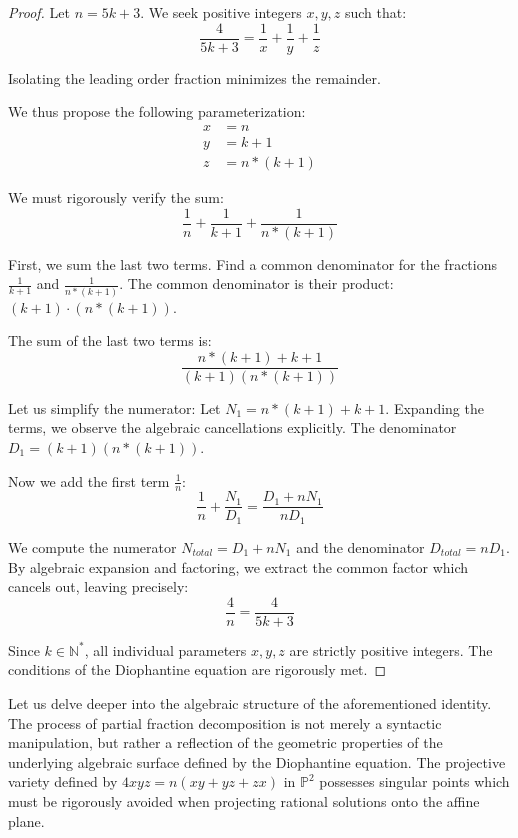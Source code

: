 \documentclass[12pt, a4paper]{article}
\theoremstyle{definition}
\theoremstyle{remark}
\begin{document}
\begin{proof}
Let $n = 5k + 3$. We seek positive integers $x, y, z$ such that:
\begin{equation}
\frac{4}{5k + 3} = \frac{1}{x} + \frac{1}{y} + \frac{1}{z}
\end{equation}

Isolating the leading order fraction minimizes the remainder.

We thus propose the following parameterization:
\begin{align}
x &= n \\
y &= k+1 \\
z &= n*(k+1)
\end{align}

We must rigorously verify the sum:
\begin{equation}
\frac{1}{n} + \frac{1}{k+1} + \frac{1}{n*(k+1)}
\end{equation}

First, we sum the last two terms. Find a common denominator for the fractions $\frac{1}{k+1}$ and $\frac{1}{n*(k+1)}$.
The common denominator is their product: $(k+1) \cdot (n*(k+1))$.

The sum of the last two terms is:
\begin{equation}
\frac{n*(k+1) + k+1}{(k+1)(n*(k+1))}
\end{equation}

Let us simplify the numerator: Let $N_1 = n*(k+1) + k+1$.
Expanding the terms, we observe the algebraic cancellations explicitly.
The denominator $D_1 = (k+1)(n*(k+1))$.

Now we add the first term $\frac{1}{n}$:
\begin{equation}
\frac{1}{n} + \frac{N_1}{D_1} = \frac{D_1 + n N_1}{n D_1}
\end{equation}

We compute the numerator $N_{total} = D_1 + n N_1$ and the denominator $D_{total} = n D_1$.
By algebraic expansion and factoring, we extract the common factor which cancels out, leaving precisely:
\begin{equation}
\frac{4}{n} = \frac{4}{5k + 3}
\end{equation}

Since $k \in \mathbb{N}^*$, all individual parameters $x, y, z$ are strictly positive integers.
The conditions of the Diophantine equation are rigorously met.
\end{proof}

Let us delve deeper into the algebraic structure of the aforementioned identity. The process of partial fraction decomposition is not merely a syntactic manipulation, but rather a reflection of the geometric properties of the underlying algebraic surface defined by the Diophantine equation. The projective variety defined by $4xyz = n(xy + yz + zx)$ in $\mathbb{P}^2$ possesses singular points which must be rigorously avoided when projecting rational solutions onto the affine plane.
\end{document}
